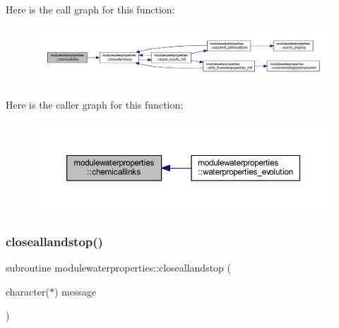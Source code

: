 Here is the call graph for this function\+:\nopagebreak
\begin{figure}[H]
\begin{center}
\leavevmode
\includegraphics[width=350pt]{namespacemodulewaterproperties_af5a9b4a5acf0da8a86fcabea8bf09f28_cgraph}
\end{center}
\end{figure}
Here is the caller graph for this function\+:\nopagebreak
\begin{figure}[H]
\begin{center}
\leavevmode
\includegraphics[width=350pt]{namespacemodulewaterproperties_af5a9b4a5acf0da8a86fcabea8bf09f28_icgraph}
\end{center}
\end{figure}
\mbox{\label{namespacemodulewaterproperties_a5bb74dfe4637836633ca6817a4a72758}} 
\subsubsection{\texorpdfstring{closeallandstop()}{closeallandstop()}}
{\footnotesize\ttfamily subroutine modulewaterproperties\+::closeallandstop (\begin{DoxyParamCaption}\item[{character($\ast$)}]{message }\end{DoxyParamCaption})\hspace{0.3cm}{\ttfamily [private]}}

